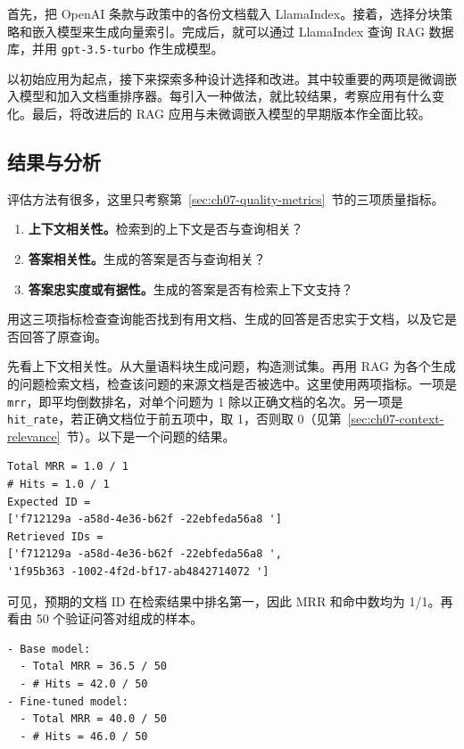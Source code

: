 首先，把 OpenAI 条款与政策中的各份文档载入 LlamaIndex。接着，选择分块策略和嵌入模型来生成向量索引。完成后，就可以通过 LlamaIndex 查询 RAG 数据库，并用 \texttt{gpt-3.5-turbo} 作生成模型。

以初始应用为起点，接下来探索多种设计选择和改进。其中较重要的两项是微调嵌入模型和加入文档重排序器。每引入一种做法，就比较结果，考察应用有什么变化。最后，将改进后的 RAG 应用与未微调嵌入模型的早期版本作全面比较。

\subsection{结果与分析}
评估方法有很多，这里只考察第~\ref{sec:ch07-quality-metrics}~节的三项质量指标。

\begin{enumerate}
\item \textbf{上下文相关性。}检索到的上下文是否与查询相关？
\item \textbf{答案相关性。}生成的答案是否与查询相关？
\item \textbf{答案忠实度或有据性。}生成的答案是否有检索上下文支持？
\end{enumerate}

用这三项指标检查查询能否找到有用文档、生成的回答是否忠实于文档，以及它是否回答了原查询。

先看上下文相关性。从大量语料块生成问题，构造测试集。再用 RAG 为各个生成的问题检索文档，检查该问题的来源文档是否被选中。这里使用两项指标。一项是 \texttt{mrr}，即平均倒数排名，对单个问题为 1 除以正确文档的名次。另一项是 \texttt{hit\_rate}，若正确文档位于前五项中，取 1，否则取 0（见第~\ref{sec:ch07-context-relevance}~节）。以下是一个问题的结果。

\noindent\begin{minipage}{\linewidth}
\begin{lstlisting}[caption={上下文相关性示例},label={lst:ch07-context-example}]
Total MRR = 1.0 / 1
# Hits = 1.0 / 1
Expected ID =
['f712129a -a58d-4e36-b62f -22ebfeda56a8 ']
Retrieved IDs =
['f712129a -a58d-4e36-b62f -22ebfeda56a8 ',
'1f95b363 -1002-4f2d-bf17-ab4842714072 ']
\end{lstlisting}
\end{minipage}\par

可见，预期的文档 ID 在检索结果中排名第一，因此 MRR 和命中数均为 1/1。再看由 50 个验证问答对组成的样本。

\noindent\begin{minipage}{\linewidth}
\begin{lstlisting}[caption={上下文相关性分数},label={lst:ch07-context-scores}]
- Base model:
  - Total MRR = 36.5 / 50
  - # Hits = 42.0 / 50
- Fine-tuned model:
  - Total MRR = 40.0 / 50
  - # Hits = 46.0 / 50
\end{lstlisting}
\end{minipage}\par


